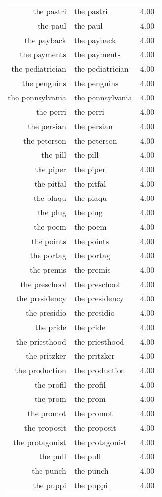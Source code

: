 \begin{table}[ht]
\begin{tabular}{rlr}
  the pastri & the pastri & 4.00 \\ 
  the paul & the paul & 4.00 \\ 
  the payback & the payback & 4.00 \\ 
  the payments & the payments & 4.00 \\ 
  the pediatrician & the pediatrician & 4.00 \\ 
  the penguins & the penguins & 4.00 \\ 
  the pennsylvania & the pennsylvania & 4.00 \\ 
  the perri & the perri & 4.00 \\ 
  the persian & the persian & 4.00 \\ 
  the peterson & the peterson & 4.00 \\ 
  the pill & the pill & 4.00 \\ 
  the piper & the piper & 4.00 \\ 
  the pitfal & the pitfal & 4.00 \\ 
  the plaqu & the plaqu & 4.00 \\ 
  the plug & the plug & 4.00 \\ 
  the poem & the poem & 4.00 \\ 
  the points & the points & 4.00 \\ 
  the portag & the portag & 4.00 \\ 
  the premis & the premis & 4.00 \\ 
  the preschool & the preschool & 4.00 \\ 
  the presidency & the presidency & 4.00 \\ 
  the presidio & the presidio & 4.00 \\ 
  the pride & the pride & 4.00 \\ 
  the priesthood & the priesthood & 4.00 \\ 
  the pritzker & the pritzker & 4.00 \\ 
  the production & the production & 4.00 \\ 
  the profil & the profil & 4.00 \\ 
  the prom & the prom & 4.00 \\ 
  the promot & the promot & 4.00 \\ 
  the proposit & the proposit & 4.00 \\ 
  the protagonist & the protagonist & 4.00 \\ 
  the pull & the pull & 4.00 \\ 
  the punch & the punch & 4.00 \\ 
  the puppi & the puppi & 4.00 \\ 

\end{tabular}
\end{table}
